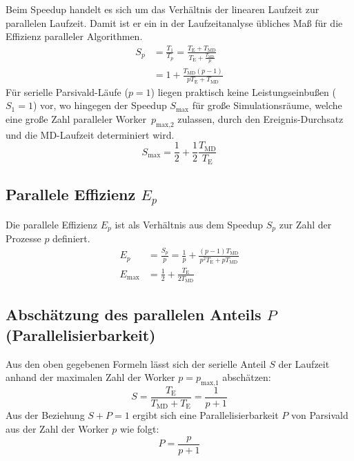 Beim Speedup handelt es sich um das Verhältnis der linearen Laufzeit zur parallelen Laufzeit.
Damit ist er ein in der Laufzeitanalyse übliches Maß für die Effizienz paralleler Algorithmen.
\begin{align}
  S_p & = \frac{T_1}{T_p} = \frac{T_\text{E} + T_\text{MD}}{T_\text{E} + \frac{T_\text{MD}}{p}} \\
      & = 1 + \frac{T_\text{MD} (p - 1)}{p T_\text{E} + T_\text{MD}}
\end{align}
Für serielle Parsivald-Läufe ($p=1$) liegen praktisch keine Leistungseinbußen ($S_1=1$) vor, wo hingegen der Speedup $S_\text{max}$ für große Simulationsräume, welche eine große Zahl paralleler Worker~$p_\text{max,2}$ zulassen, durch den Ereignis-Durchsatz und die MD-Laufzeit determiniert wird.
\begin{equation}
  S_\text{max} = \frac{1}{2} + \frac{1}{2}\frac{T_\text{MD}}{T_\text{E}}
\end{equation}

\subsection{Parallele Effizienz $E_p$}

Die parallele Effizienz $E_p$ ist als Verhältnis aus dem Speedup $S_p$ zur Zahl der Prozesse $p$ definiert.
\begin{align}
  E_p & = \frac{S_p}{p} = \frac{1}{p} + \frac{(p-1) T_\text{MD}}{p^2 T_\text{E} + p T_\text{MD}} \\
  E_\text{max} & = \frac{1}{2} + \frac{T_\text{E}}{2 T_\text{MD}}
\end{align}

\subsection{Abschätzung des parallelen Anteils $P$ (Parallelisierbarkeit)}

Aus den oben gegebenen Formeln lässt sich der serielle Anteil $S$ der Laufzeit anhand der maximalen Zahl der Worker $p = p_\text{max,1}$ abschätzen:
\begin{equation}
  S = \frac{T_\text{E}}{T_\text{MD} + T_\text{E}} = \frac{1}{p + 1}
\end{equation}
Aus der Beziehung $S + P = 1$ ergibt sich eine Parallelisierbarkeit $P$ von Parsivald aus der Zahl der Worker $p$ wie folgt:
\begin{equation}
  P = \frac{p}{p+1}
\end{equation}

